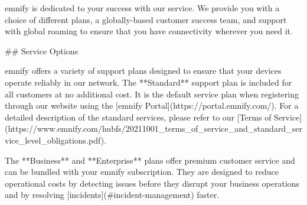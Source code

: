 \documentclass[11pt, oneside]{article}   	%
\begin{document}
\begin{markdown}

emnify is dedicated to your success with our service.
We provide you with a choice of different plans, a globally-based customer success team, and support with global roaming to ensure that you have connectivity wherever you need it.

## Service Options

emnify offers a variety of support plans designed to ensure that your devices operate reliably in our network.
The **Standard** support plan is included for all customers at no additional cost.
It is the default service plan when registering through our website using the [emnify Portal](https://portal.emnify.com/).
For a detailed description of the standard services, please refer to our [Terms of Service](https://www.emnify.com/hubfs/20211001_terms_of_service_and_standard_service_level_obligations.pdf).

The **Business** and **Enterprise** plans offer premium customer service and can be bundled with your emnify subscription.
They are designed to reduce operational costs by detecting issues before they disrupt your business operations and by resolving [incidents](#incident-management) faster.

\end{markdown}
\end{document}
